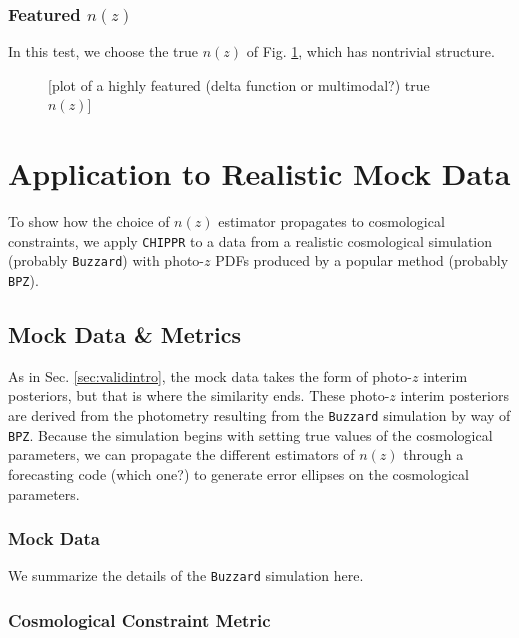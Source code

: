 \documentclass[iop]{emulateapj}
\newcommand{\chippr}{\texttt{CHIPPR} }
\begin{document}
\subsubsection{Featured $n(z)$}
\label{sec:featured}

In this test, we choose the true $n(z)$ of Fig. \ref{fig:featured}, which has nontrivial structure.

\begin{figure}
	\begin{center}
		\caption{[plot of a highly featured (delta function or multimodal?) true $n(z)$]}
		\label{fig:featured}
	\end{center}
\end{figure}

\section{Application to Realistic Mock Data}
\label{sec:application}

To show how the choice of $n(z)$ estimator propagates to cosmological constraints, we apply \chippr to a data from a realistic cosmological simulation (probably \texttt{Buzzard}) with photo-$z$ PDFs produced by a popular method (probably \texttt{BPZ}).

\subsection{Mock Data \& Metrics}
\label{sec:appintro}

As in Sec. \ref{sec:validintro}, the mock data takes the form of photo-$z$ interim posteriors, but that is where the similarity ends.  These photo-$z$ interim posteriors are derived from the photometry resulting from the \texttt{Buzzard} simulation by way of \texttt{BPZ}.  Because the simulation begins with setting true values of the cosmological parameters, we can propagate the different estimators of $n(z)$ through a forecasting code (which one?) to generate error ellipses on the cosmological parameters.

\subsubsection{Mock Data}
\label{sec:buzzard}

We summarize the details of the \texttt{Buzzard} simulation here.

\subsubsection{Cosmological Constraint Metric}
\label{sec:cosmo}
\end{document}
